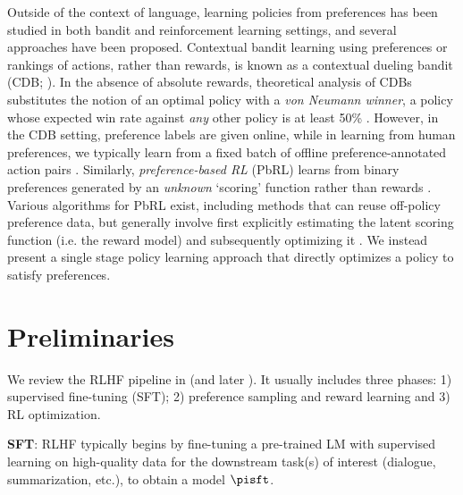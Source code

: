 Outside of the context of language, learning policies from preferences has been studied in both bandit and reinforcement learning settings, and several approaches have been proposed. Contextual bandit learning using preferences or rankings of actions, rather than rewards, is known as a contextual dueling bandit (CDB; \cite{yue2012karmed,dudik2015contextual}). In the absence of absolute rewards, theoretical analysis of CDBs substitutes the notion of an optimal policy with a \textit{von Neumann winner}, a policy whose expected win rate against \textit{any} other policy is at least 50\% \citep{dudik2015contextual}. However, in the CDB setting, preference labels are given online, while in learning from human preferences, we typically learn from a fixed batch of offline preference-annotated action pairs \citep{yan2022human}. Similarly, \textit{preference-based RL} (PbRL) learns from binary preferences generated by an \textit{unknown} `scoring' function rather than rewards \citep{BusaFekete2014,ruiz2023dueling}. Various algorithms for PbRL exist, including methods that can reuse off-policy preference data, but generally involve first explicitly estimating the latent scoring function (i.e. the reward model) and subsequently optimizing it \citep{jain2013learning,BusaFekete2014,christiano2017deep,sadigh2017active,kupcsik2018learning}. We instead present a single stage policy learning approach that directly optimizes a policy to satisfy preferences.



\section{Preliminaries}\label{section:prelims}

We review the RLHF pipeline in \citeauthor{ziegler2020finetuning} (and later \citep{stiennon2022learning, bai2022training, ouyang2022training}). It usually includes three phases: 1) supervised fine-tuning (SFT); 2) preference sampling and reward learning and 3) RL optimization.

\textbf{SFT}: RLHF typically begins by fine-tuning a pre-trained LM with supervised learning on high-quality data for the downstream task(s) of interest (dialogue, summarization, etc.), to obtain a model $\pisft$. 

